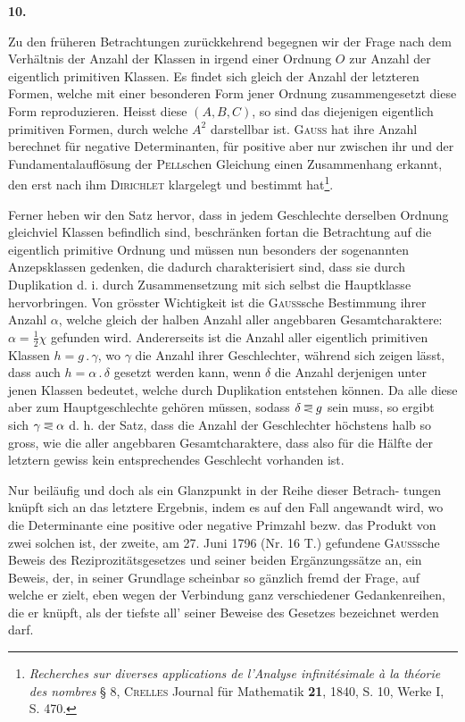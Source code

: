 \begin{center}\bfseries 10.\end{center}
\noindent\hspace*{\parindent}Zu den früheren Betrachtungen zurückkehrend begegnen wir der Frage nach dem Verhältnis der Anzahl der Klassen in irgend einer Ordnung \(O\) zur Anzahl der eigentlich primitiven Klassen. Es findet sich gleich der Anzahl der letzteren Formen, welche mit einer besonderen Form jener Ordnung zusammengesetzt diese Form reproduzieren. Heisst diese \((A,B,C)\), so sind das diejenigen eigentlich primitiven Formen, durch welche \(A^2\) darstellbar ist. \textsc{Gauss} hat ihre Anzahl berechnet für negative Determinanten, für positive aber nur zwischen ihr und der Fundamentalauflösung der \textsc{Pell}schen Gleichung einen Zusammenhang erkannt, den erst nach ihm \textsc{Dirichlet} klargelegt und bestimmt hat\footnote{\textit{Recherches sur diverses applications de l’Analyse infinitésimale à la théorie des nombres} § 8, \textsc{Crelles} Journal für Mathematik \textbf{21}, 1840, S. 10, Werke I, S. 470.}.

Ferner heben wir den Satz hervor, dass in jedem Geschlechte derselben Ordnung gleichviel Klassen befindlich sind, beschränken fortan die Betrachtung auf die eigentlich primitive Ordnung und müssen nun besonders der sogenannten Anzepsklassen gedenken, die dadurch charakterisiert sind, dass sie durch Duplikation d. i. durch Zusammensetzung mit sich selbst die Hauptklasse hervorbringen. Von grösster Wichtigkeit ist die \textsc{Gauss}sche Bestimmung ihrer Anzahl \(\alpha\), welche gleich der halben Anzahl aller angebbaren Gesamtcharaktere: \(\alpha=\frac12\chi\) gefunden wird. Andererseits ist die Anzahl aller eigentlich primitiven Klassen \(h=g\mathbin{.}\gamma\), wo \(\gamma\) die Anzahl ihrer Geschlechter, während sich zeigen lässt, dass auch \(h=\alpha\mathbin{.}\delta\) gesetzt werden kann, wenn \(\delta\) die Anzahl derjenigen unter jenen Klassen bedeutet, welche durch Duplikation entstehen können. Da alle diese aber zum Hauptgeschlechte gehören müssen, sodass \(\delta\EqualAboveLess g\) sein muss, so ergibt sich \(\gamma\EqualAboveLess\alpha\) d. h. der Satz, dass die Anzahl der Geschlechter höchstens halb so gross, wie die aller angebbaren Gesamtcharaktere, dass also für die Hälfte der letztern gewiss kein entsprechendes Geschlecht vorhanden ist.

Nur beiläufig und doch als ein Glanzpunkt in der Reihe dieser Betrach-\newpage
{}
\noindent tungen knüpft sich an das letztere Ergebnis, indem es auf den Fall angewandt wird, wo die Determinante eine positive oder negative Primzahl bezw. das Produkt von zwei solchen ist, der zweite, am 27. Juni 1796 (Nr. 16 T.) gefundene \textsc{Gauss}sche Beweis des Reziprozitätsgesetzes und seiner beiden Ergänzungssätze an, ein Beweis, der, in seiner Grundlage scheinbar so gänzlich fremd der Frage, auf welche er zielt, eben wegen der Verbindung ganz verschiedener Gedankenreihen, die er knüpft, als der tiefste all’ seiner Beweise des Gesetzes bezeichnet werden darf.
